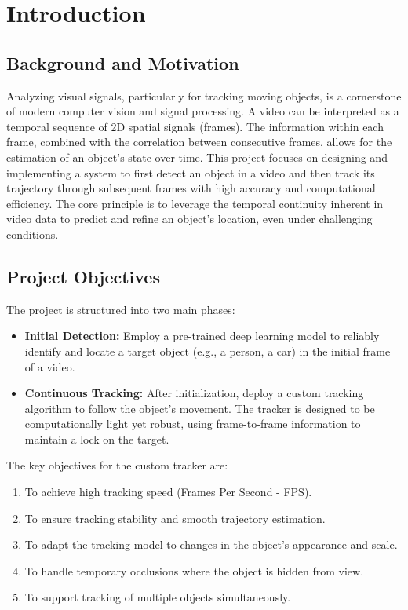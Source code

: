\documentclass[12pt, a4paper]{report}
\begin{document}
\chapter{Introduction}

\section{Background and Motivation}
Analyzing visual signals, particularly for tracking moving objects, is a cornerstone of modern computer vision and signal processing. A video can be interpreted as a temporal sequence of 2D spatial signals (frames). The information within each frame, combined with the correlation between consecutive frames, allows for the estimation of an object's state over time. This project focuses on designing and implementing a system to first detect an object in a video and then track its trajectory through subsequent frames with high accuracy and computational efficiency. The core principle is to leverage the temporal continuity inherent in video data to predict and refine an object's location, even under challenging conditions.

\section{Project Objectives}
The project is structured into two main phases:
\begin{itemize}
    \item \textbf{Initial Detection:} Employ a pre-trained deep learning model to reliably identify and locate a target object (e.g., a person, a car) in the initial frame of a video.
    \item \textbf{Continuous Tracking:} After initialization, deploy a custom tracking algorithm to follow the object's movement. The tracker is designed to be computationally light yet robust, using frame-to-frame information to maintain a lock on the target.
\end{itemize}

The key objectives for the custom tracker are:
\begin{enumerate}
    \item To achieve high tracking speed (Frames Per Second - FPS).
    \item To ensure tracking stability and smooth trajectory estimation.
    \item To adapt the tracking model to changes in the object's appearance and scale.
    \item To handle temporary occlusions where the object is hidden from view.
    \item To support tracking of multiple objects simultaneously.
\end{enumerate}
\end{document}
